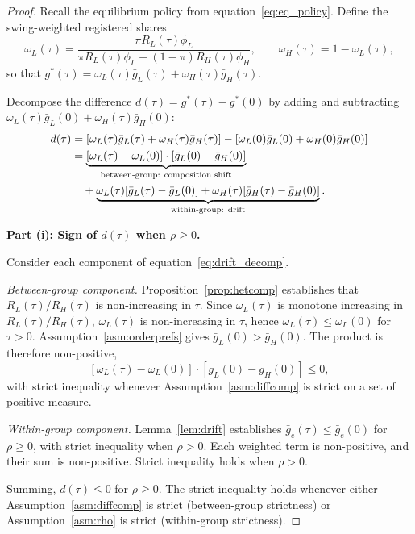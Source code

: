 \begin{proof}
Recall the equilibrium policy from equation~\eqref{eq:eq_policy}. Define the swing-weighted registered shares
\[
\omega_L(\tau) = \frac{\pi R_L(\tau) \phi_L}{\pi R_L(\tau) \phi_L + (1-\pi) R_H(\tau) \phi_H}, \qquad \omega_H(\tau) = 1 - \omega_L(\tau),
\]
so that $g^*(\tau) = \omega_L(\tau) \bar g_L(\tau) + \omega_H(\tau) \bar g_H(\tau)$.

Decompose the difference $d(\tau) = g^*(\tau) - g^*(0)$ by adding and subtracting $\omega_L(\tau) \bar g_L(0) + \omega_H(\tau) \bar g_H(0)$:
\begin{align}
d(\tau) &= [\omega_L(\tau) \bar g_L(\tau) + \omega_H(\tau) \bar g_H(\tau)] - [\omega_L(0) \bar g_L(0) + \omega_H(0) \bar g_H(0)] \notag \\
&= \underbrace{[\omega_L(\tau) - \omega_L(0)] \cdot [\bar g_L(0) - \bar g_H(0)]}_{\text{between-group: composition shift}} \notag \\
&\quad + \underbrace{\omega_L(\tau)[\bar g_L(\tau) - \bar g_L(0)] + \omega_H(\tau)[\bar g_H(\tau) - \bar g_H(0)]}_{\text{within-group: drift}}. \label{eq:drift_decomp}
\end{align}

\textbf{Part (i): Sign of $d(\tau)$ when $\rho \geq 0$.}

Consider each component of equation~\eqref{eq:drift_decomp}.

\emph{Between-group component.} Proposition~\ref{prop:hetcomp} establishes that $R_L(\tau)/R_H(\tau)$ is non-increasing in $\tau$. Since $\omega_L(\tau)$ is monotone increasing in $R_L(\tau)/R_H(\tau)$, $\omega_L(\tau)$ is non-increasing in $\tau$, hence $\omega_L(\tau) \leq \omega_L(0)$ for $\tau > 0$. Assumption~\ref{asm:orderprefs} gives $\bar g_L(0) > \bar g_H(0)$. The product is therefore non-positive,
\[
[\omega_L(\tau) - \omega_L(0)] \cdot [\bar g_L(0) - \bar g_H(0)] \leq 0,
\]
with strict inequality whenever Assumption~\ref{asm:diffcomp} is strict on a set of positive measure.

\emph{Within-group component.} Lemma~\ref{lem:drift} establishes $\bar g_e(\tau) \leq \bar g_e(0)$ for $\rho \geq 0$, with strict inequality when $\rho > 0$. Each weighted term is non-positive, and their sum is non-positive. Strict inequality holds when $\rho > 0$.

Summing, $d(\tau) \leq 0$ for $\rho \geq 0$. The strict inequality holds whenever either Assumption~\ref{asm:diffcomp} is strict (between-group strictness) or Assumption~\ref{asm:rho} is strict (within-group strictness).


\end{proof}
